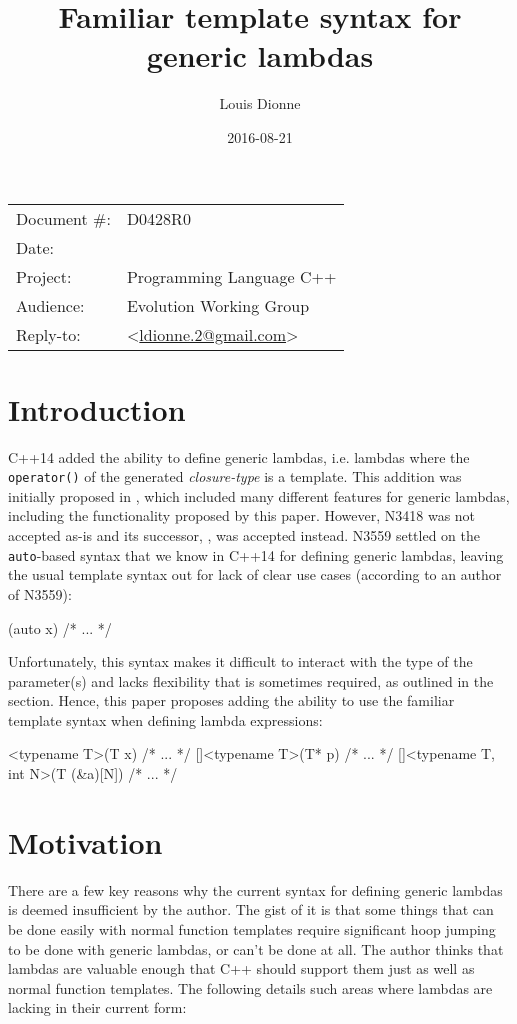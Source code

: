 \documentclass[11pt]{article}
\date{}
\title{Familiar template syntax for generic lambdas}
\author{}
\newcommand{\cc}[1]{\texttt{#1}}
\begin{document}
\maketitle\vspace{-2cm}

\begin{flushright}
  \begin{tabular}{ll}
  Document \#:&D0428R0\\
  Date:       &\date{2016-08-21}\\
  Project:    &Programming Language C++\\
  Audience:   &Evolution Working Group\\
  Reply-to:   &\author{Louis Dionne} \textless\href{mailto:ldionne.2@gmail.com}{ldionne.2@gmail.com}\textgreater
  \end{tabular}
\end{flushright}


\section{Introduction}
C++14 added the ability to define generic lambdas, i.e. lambdas where the
\cc{operator()} of the generated \textit{closure-type} is a template. This
addition was initially proposed in \cite{N3418}, which included many different
features for generic lambdas, including the functionality proposed by this
paper. However, N3418 was not accepted as-is and its successor,
\cite{N3559}, was accepted instead. N3559 settled on the \cc{auto}-based
syntax that we know in C++14 for defining generic lambdas, leaving the
usual template syntax out for lack of clear use cases (according to an author
of N3559):

\begin{cpp}
[](auto x) { /* ... */ }
\end{cpp}

Unfortunately, this syntax makes it difficult to interact with the type of the
parameter(s) and lacks flexibility that is sometimes required, as outlined in
the  section. Hence, this paper proposes adding the ability
to use the familiar template syntax when defining lambda expressions:

\begin{cpp}
[]<typename T>(T x) { /* ... */ }
[]<typename T>(T* p) { /* ... */ }
[]<typename T, int N>(T (&a)[N]) { /* ... */ }
\end{cpp}


\section{Motivation} \label{motivation}
There are a few key reasons why the current syntax for defining generic lambdas
is deemed insufficient by the author. The gist of it is that some things that
can be done easily with normal function templates require significant hoop
jumping to be done with generic lambdas, or can't be done at all. The author
thinks that lambdas are valuable enough that C++ should support them just as
well as normal function templates. The following details such areas where
lambdas are lacking in their current form:
\end{document}
